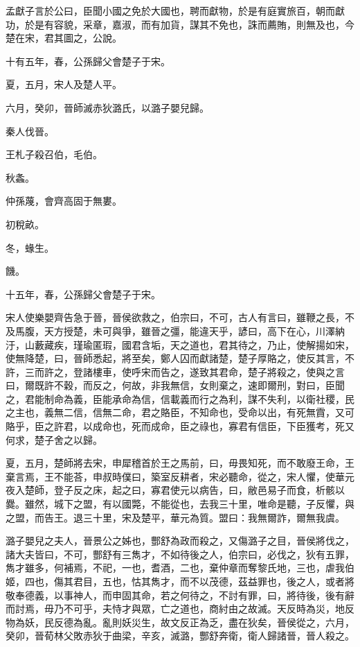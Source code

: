\begin{pinyinscope}
孟獻子言於公曰，臣聞小國之免於大國也，聘而獻物，於是有庭實旅百，朝而獻功，於是有容貌，采章，嘉淑，而有加貨，謀其不免也，誅而薦賄，則無及也，今楚在宋，君其圖之，公說。

十有五年，春，公孫歸父會楚子于宋。

夏，五月，宋人及楚人平。

六月，癸卯，晉師滅赤狄潞氏，以潞子嬰兒歸。

秦人伐晉。

王札子殺召伯，毛伯。

秋螽。

仲孫蔑，會齊高固于無婁。

初稅畝。

冬，蝝生。

饑。

十五年，春，公孫歸父會楚子于宋。

宋人使樂嬰齊告急于晉，晉侯欲救之，伯宗曰，不可，古人有言曰，雖鞭之長，不及馬腹，天方授楚，未可與爭，雖晉之彊，能違天乎，諺曰，高下在心，川澤納汙，山藪藏疾，瑾瑜匿瑕，國君含垢，天之道也，君其待之，乃止，使解揚如宋，使無降楚，曰，晉師悉起，將至矣，鄭人囚而獻諸楚，楚子厚賂之，使反其言，不許，三而許之，登諸樓車，使呼宋而告之，遂致其君命，楚子將殺之，使與之言曰，爾既許不穀，而反之，何故，非我無信，女則棄之，速即爾刑，對曰，臣聞之，君能制命為義，臣能承命為信，信載義而行之為利，謀不失利，以衛社稷，民之主也，義無二信，信無二命，君之賂臣，不知命也，受命以出，有死無霣，又可賂乎，臣之許君，以成命也，死而成命，臣之祿也，寡君有信臣，下臣獲考，死又何求，楚子舍之以歸。

夏，五月，楚師將去宋，申犀稽首於王之馬前，曰，毋畏知死，而不敢廢王命，王棄言焉，王不能荅，申叔時僕曰，築室反耕者，宋必聽命，從之，宋人懼，使華元夜入楚師，登子反之床，起之曰，寡君使元以病告，曰，敝邑易子而食，析骸以爨。雖然，城下之盟，有以國斃，不能從也，去我三十里，唯命是聽，子反懼，與之盟，而告王。退三十里，宋及楚平，華元為質。盟曰：我無爾詐，爾無我虞。

潞子嬰兒之夫人，晉景公之姊也，酆舒為政而殺之，又傷潞子之目，晉侯將伐之，諸大夫皆曰，不可，酆舒有三雋才，不如待後之人，伯宗曰，必伐之，狄有五罪，雋才雖多，何補焉，不祀，一也，耆酒，二也，棄仲章而奪黎氏地，三也，虐我伯姬，四也，傷其君目，五也，怙其雋才，而不以茂德，茲益罪也，後之人，或者將敬奉德義，以事神人，而申固其命，若之何待之，不討有罪，曰，將待後，後有辭而討焉，毋乃不可乎，夫恃才與眾，亡之道也，商紂由之故滅。天反時為災，地反物為妖，民反德為亂。亂則妖災生，故文反正為乏，盡在狄矣，晉侯從之，六月，癸卯，晉荀林父敗赤狄于曲梁，辛亥，滅潞，酆舒奔衛，衛人歸諸晉，晉人殺之。


\end{pinyinscope}
